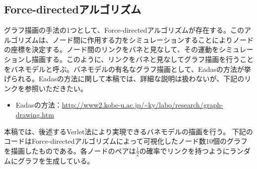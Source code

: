 \documentclass[dvipdfmx]{jsarticle}
\begin{document}
\subsection{Force-directedアルゴリズム}
グラフ描画の手法の1つとして、Force-directedアルゴリズムが存在する。このアルゴリズムは、ノード間に作用する力をシミュレーションすることによりノードの座標を決定する。ノード間のリンクをバネと見なして、その運動をシミュレーションし描画する。このように、リンクをバネと見なしてグラフ描画を行うことをバネモデルと呼ぶ。バネモデルの有名なグラフ描画として、Eadasの方法が挙げられる。Eadasの方法に関して本稿では、詳細な説明は扱わないが、下記のリンクを参照いただきたい。
\begin{itemize}
  \item Eadasの方法：\url{http://www2.kobe-u.ac.jp/~ky/labo/research/graph-drawing.htm}
\end{itemize}
本稿では、後述するVerlet法により実現できるバネモデルの描画を行う。
下記のコードはForce-directedアルゴリズムによって可視化したノード数10個のグラフを描画したものである。各ノードのペアは$\frac{1}{2}$の確率でリンクを持つようにランダムにグラフを生成している。
\end{document}
